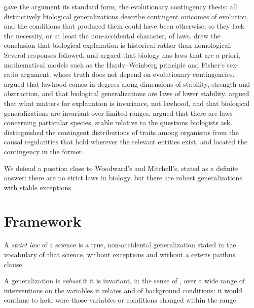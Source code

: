 \documentclass{situationist-preprint}
\begin{document}
\citet{Beatty1995} gave the argument its standard form, the evolutionary contingency thesis: all distinctively biological generalizations describe contingent outcomes of evolution, and the conditions that produced them could have been otherwise; so they lack the necessity, or at least the non-accidental character, of laws. \citet{Rosenberg2001} drew the conclusion that biological explanation is historical rather than nomological. Several responses followed. \citet{Sober1997} and \citet{Elgin2003} argued that biology has laws that are a priori, mathematical models such as the Hardy--Weinberg principle and Fisher's sex-ratio argument, whose truth does not depend on evolutionary contingencies. \citet{Mitchell1997,Mitchell2000} argued that lawhood comes in degrees along dimensions of stability, strength and abstraction, and that biological generalizations are laws of lower stability. \citet{Woodward2001} argued that what matters for explanation is invariance, not lawhood, and that biological generalizations are invariant over limited ranges. \citet{Lange1995} argued that there are laws concerning particular species, stable relative to the questions biologists ask. \citet{Waters1998} distinguished the contingent distributions of traits among organisms from the causal regularities that hold wherever the relevant entities exist, and located the contingency in the former.

We defend a position close to Woodward's and Mitchell's, stated as a definite answer: there are no strict laws in biology, but there are robust generalizations with stable exceptions.

\section{Framework}\label{s:framework}

\begin{definition}\label{d:strict}
A \emph{strict law} of a science is a true, non-accidental generalization stated in the vocabulary of that science, without exceptions and without a ceteris paribus clause.
\end{definition}

\begin{definition}[Robustness]\label{d:robust}
A generalization is \emph{robust} if it is invariant, in the sense of \citet{Woodward2003}, over a wide range of interventions on the variables it relates and of background conditions: it would continue to hold were those variables or conditions changed within the range.
\end{definition}
\end{document}
